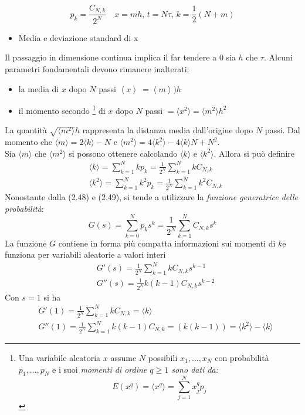 \documentclass[a4paper,12pt, draft]{article}
\theoremstyle{break}
\numberwithin{equation}{section}
\begin{document}
\begin{equation}
  p_k = \frac{C_{N,k}}{2^N} \quad x = mh, \, t = N\tau, \, k = \frac{1}{2}(N+m)
\end{equation}
\begin{itemize}
  \item Media e deviazione standard di x
\end{itemize}
Il passaggio in dimensione continua implica il far tendere a \(0\) sia \(h\) che \(\tau\). Alcuni parametri fondamentali devono rimanere inalterati:
\begin{itemize}
  \item la media di \(x\) dopo \(N\) passi \(\left\langle x\right\rangle\ = \left\langle m \right\rangle) h\)
  \item il momento secondo \footnote{Una variabile aleatoria \(x\) assume \(N\) possibili \(x_1,\ldots, x_N\) con probabilità \(p_1,\ldots,p_N\) e i suoi \emph{momenti di ordine \(q\geq 1\) sono dati da:
  \[
    E(x^q) = \langle x^q \rangle = \sum_{j=1}^N x_j^q p_j
  \]}} di \(x\) dopo \(N\) passi \(= \langle x^2 \rangle = \langle m^2 \rangle h^2\)
\end{itemize}
La quantità \(\sqrt{\langle m^2\rangle}h\) rappresenta la distanza media dall'origine dopo \(N\) passi. 
Dal momento che \(\langle m \rangle = 2\langle k\rangle - N\) e \(\langle m^2 \rangle = 4 \langle k^2 \rangle - 4 \langle k \rangle N + N^2\). \\
Sia \(\langle m \rangle\) che \(\langle m^2 \rangle\) si possono ottenere calcolando \(\langle k \rangle\) e \(\langle k^2 \rangle\). Allora si può definire
\begin{align}
  & \langle k \rangle = \sum_{k = 1}^N kp_k = \frac{1}{2^N} \sum_{k=1}^N kC_{N,k} \\
  & \langle k^2 \rangle = \sum_{k=1}^N k^2 p_k = \frac{1}{2^N} \sum_{k=1}^N k^2 C_{N, k}
\end{align}
Nonostante dalla (2.48) e (2.49), si tende a utilizzare la \emph{funzione generatrice delle probabilità}:
\[
  G(s) = \sum_{k = 0}^N p_k s^k = \frac{1}{2^N} \sum_{k = 1}^N C_{N,k}s^{k}
\]
La funzione  \(G\) contiene in forma più compatta informazioni sui momenti di \(k\)e funziona per variabili aleatorie a valori interi
\begin{align}
  & G'(s) = \frac{1}{2^N} \sum_{k = 1}^N kC_{N,k} s^{k-1} \\
  & G''(s) = \frac{1}{2^N} k(k-1) C_{N,k} s^{k-2}
\end{align}
Con \(s = 1\) si ha 
\begin{align}
  & G'(1) = \frac{1}{2^N} \sum_{k = 1}^N k C_{N,k} = \langle k \rangle \\
  & G''(1) = \frac{1}{2^N} \sum_{k = 1}^N k(k -1)C_{N,k} = (k(k-1)) = \langle k^2 \rangle - \langle k \rangle
\end{align}
\end{document}
